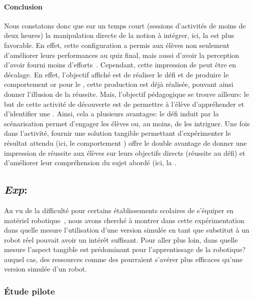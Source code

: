         \paragraph{Conclusion}
            Nous constatons donc que sur un temps court (sessions d'activités de moins de deux heures) la manipulation directe de la notion à intégrer, ici, la  est plus favorable. En effet, cette configuration a permis aux élèves non seulement d'améliorer leurs performances au quiz final, mais aussi d'avoir la perception d'avoir fourni moins d'efforts~. Cependant, cette impression de  peut être en décalage. En effet, l'objectif affiché est de réaliser le défi et de produire le comportement  or pour le , cette production est déjà réalisée, pouvant ainsi donner l'illusion de la réussite. Mais, l'objectif pédagogique se trouve ailleurs: le but de cette activité de découverte est de permettre à l'élève d'appréhender et d'identifier une . Ainsi, cela a plusieurs avantages: le défi induit par la scénarisation permet d'engager les élèves ou, au moins, de les intriguer. Une fois dans l'activité, fournir une solution tangible permettant d'expérimenter le résultat attendu (ici, le comportement ) offre le double avantage de donner une impression de réussite aux élèves sur leurs objectifs directs (réussite au défi) et d'améliorer  leur compréhension du sujet abordé (ici, la . 
    \subsection{\textit{Exp}: }\label{Exp:Reel_virtuel}
            Au vu de la difficulté pour certains établissements scolaires de s'équiper en matériel robotique~, nous avons cherché à montrer dans cette expérimentation dans quelle mesure l'utilisation d'une version simulée en tant que substitut à un robot réel  pouvait avoir un intérêt suffisant. Pour aller plus loin, dans quelle mesure l'aspect tangible est prédominant pour l'apprentissage de la robotique? auquel cas, des ressources comme des  pourraient s'avérer plus efficaces qu'une version simulée d'un robot.
        \subsubsection{Étude pilote}\label{Exp:Reel_virtuel-pilote}
